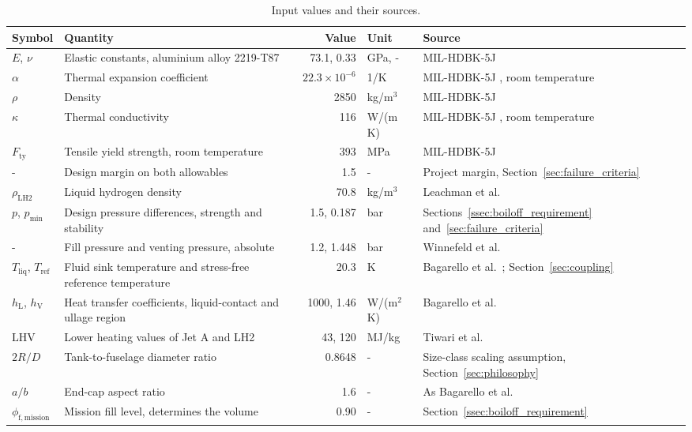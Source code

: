 \begin{table}[!htbp]
\centering
\caption[Input values and their sources]{Input values and their sources.}
\label{tab:app_inputs}
\footnotesize
\setlength{\tabcolsep}{4pt}
\begin{tabularx}{\textwidth}{@{}llrl>{\raggedright\arraybackslash}X@{}}
\toprule
Symbol & Quantity & Value & Unit & Source \\
\midrule
$E$, $\nu$ & Elastic constants, aluminium alloy 2219-T87 & 73.1, 0.33 & GPa, - & MIL-HDBK-5J \cite{ref30} \\
$\alpha$ & Thermal expansion coefficient & $22.3\times10^{-6}$ & 1/K & MIL-HDBK-5J \cite{ref30}, room temperature \\
$\rho$ & Density & 2850 & kg/m$^3$ & MIL-HDBK-5J \cite{ref30} \\
$\kappa$ & Thermal conductivity & 116 & W/(m\,K) & MIL-HDBK-5J \cite{ref30}, room temperature \\
$F_{\mathrm{ty}}$ & Tensile yield strength, room temperature & 393 & MPa & MIL-HDBK-5J \cite{ref30} \\
- & Design margin on both allowables & 1.5 & - & Project margin, Section~\ref{sec:failure_criteria} \\
$\rho_{\mathrm{LH2}}$ & Liquid hydrogen density & 70.8 & kg/m$^3$ & Leachman et al.\ \cite{ref14} \\
$p$, $p_{\mathrm{min}}$ & Design pressure differences, strength and stability & 1.5, 0.187 & bar & Sections~\ref{ssec:boiloff_requirement} and~\ref{sec:failure_criteria} \\
- & Fill pressure and venting pressure, absolute & 1.2, 1.448 & bar & Winnefeld et al.\ \cite{ref12} \\
$T_{\mathrm{liq}}$, $T_{\mathrm{ref}}$ & Fluid sink temperature and stress-free reference temperature & 20.3 & K & Bagarello et al.\ \cite{ref29}; Section~\ref{sec:coupling} \\
$h_{\mathrm{L}}$, $h_{\mathrm{V}}$ & Heat transfer coefficients, liquid-contact and ullage region & 1000, 1.46 & W/(m$^2$\,K) & Bagarello et al.\ \cite{ref29} \\
$\mathrm{LHV}$ & Lower heating values of Jet A and LH2 & 43, 120 & MJ/kg & Tiwari et al.\ \cite{ref2} \\
$2R/D$ & Tank-to-fuselage diameter ratio & 0.8648 & - & Size-class scaling assumption, Section~\ref{sec:philosophy} \\
$a/b$ & End-cap aspect ratio & 1.6 & - & As Bagarello et al.\ \cite{ref29} \\
$\phi_{\mathrm{f,mission}}$ & Mission fill level, determines the volume & 0.90 & - & Section~\ref{ssec:boiloff_requirement} \\

\end{tabularx}
\end{table}
